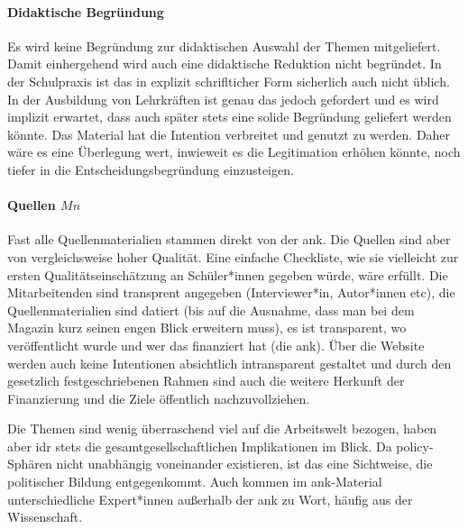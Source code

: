 
\paragraph{Didaktische Begründung}
Es wird keine Begründung zur didaktischen Auswahl der Themen mitgeliefert. Damit einhergehend wird auch eine didaktische Reduktion nicht begründet. In der Schulpraxis ist das in explizit schriflticher Form sicherlich auch nicht üblich. In der Ausbildung von Lehrkräften ist genau das jedoch gefordert und es wird implizit erwartet, dass auch später stets eine solide Begründung geliefert werden könnte.
Das Material hat die Intention verbreitet und genutzt zu werden. Daher wäre es eine Überlegung wert, inwieweit es die Legitimation erhöhen könnte, noch tiefer in die Entscheidungsbegründung einzusteigen. 


\paragraph{Quellen  $Mn$}
Fast alle Quellenmaterialien stammen direkt von der \gls{ank}.
Die Quellen sind aber von vergleichsweise hoher Qualität. Eine einfache Checkliste, wie sie vielleicht zur ersten Qualitätseinschätzung an Schüler*innen gegeben würde, wäre erfüllt. Die Mitarbeitenden sind transprent angegeben (Interviewer*in, Autor*innen \gls{etc}), die Quellenmaterialien sind datiert (bis auf die Ausnahme, dass man bei dem Magazin kurz seinen engen Blick erweitern muss), es ist transparent, wo veröffentlicht wurde und wer das finanziert hat (die \gls{ank}). Über die Website werden auch keine Intentionen absichtlich intransparent gestaltet und durch den gesetzlich festgeschriebenen Rahmen sind auch die weitere Herkunft der Finanzierung und die Ziele öffentlich nachzuvollziehen. 

Die Themen sind wenig überraschend viel auf die Arbeitswelt bezogen, haben aber \gls{idr} stets die gesamtgesellschaftlichen Implikationen im Blick. Da policy-Sphären nicht unabhängig voneinander existieren, ist das eine Sichtweise, die politischer Bildung entgegenkommt. 
Auch kommen im \gls{ank}-Material unterschiedliche Expert*innen außerhalb der \gls{ank} zu Wort, häufig aus der Wissenschaft.

